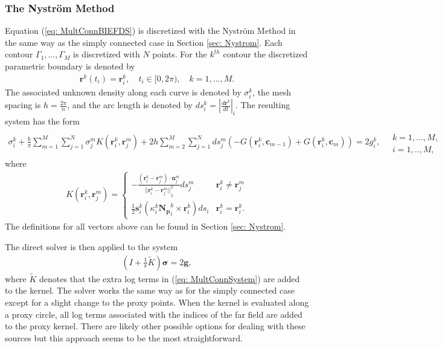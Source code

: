 \documentclass{sfuthesis}
\begin{document}
\subsubsection{The Nystr\"{o}m Method}
Equation (\ref{eq: MultConnBIEFDS}) is discretized with the Nystr\"{o}m Method in the same way as the simply connected case in Section \ref{sec: Nystrom}. Each contour $\Gamma_1, ..., \Gamma_M$ is discretized with $N$ points. For the $k^{th}$ contour the discretized parametric boundary is denoted by 
\begin{align*}
	\mathbf{r}^k(t_i)=\mathbf{r}_i^k, \quad t_i \in[0,2\pi), \quad k=1, ..., M .
\end{align*}
The associated unknown density along each curve is denoted by $\sigma^k_i$, the mesh spacing is $h=\frac{2\pi}{n}$, and the arc length is denoted by $ds^k_i=\left|\frac{d\mathbf{r}^k}{dt}\right|_i$. 
The resulting system has the form
{\small
\begin{align}
	\sigma_i^k +\frac{h}{\pi} \sum_{m=1}^M\sum_{j=1}^N \sigma_j^m K(\mathbf{r}_i^k, \mathbf{r}_j^m) +2h\sum_{m=2}^M \sum_{j=1}^N ds_j^m\left(-G(\mathbf{r}_i^k, \mathbf{c}_{m-1}) + G(\mathbf{r}_i^k, \mathbf{c}_m) \right)=2g_i^k, \quad \begin{array}{c} \\ k=1, ..., M, \\  i=1, .., M, \end{array} \label{eq: MultConnSystem}
\end{align}}
where 
\begin{align*}
	K(\mathbf{r}_i^k, \mathbf{r}_j^m)=\begin{cases} 
      	-\frac{(\mathbf{r}_i^k-\mathbf{r}_j^m)\cdot\mathbf{n}_j^m}{{||\mathbf{r}_i^k-\mathbf{r}_j^m||}_2^2}ds_j^m & \mathbf{r}_i^k\neq \mathbf{r}_j^m \\
     	 \frac{1}{2}\mathbf{s}_i^k\left(\kappa_i^k\mathbf{N_p}_i^k \times \mathbf{r}_i^k\right)ds_i &\mathbf{r}_i^k=\mathbf{r}_i^k.
        \end{cases} 
\end{align*}
The definitions for all vectors above can be found in Section \ref{sec: Nystrom}. 

The direct solver is then applied to the system 
\begin{align*}
	\left(I+\frac{1}{\pi}\tilde{K}\right)\bm{\sigma}=2\mathbf{g},
\end{align*}
where $\tilde{K}$ denotes that the extra log terms in (\ref{eq: MultConnSystem}) are added to the kernel. The solver works the same way as for the simply connected case except for a slight change to the proxy points.  When the kernel is evaluated along a proxy circle, all log terms associated with the indices of the far field are added to the proxy kernel. There are likely other possible options for dealing with these sources but this approach seems to be the most straightforward.
\end{document}
